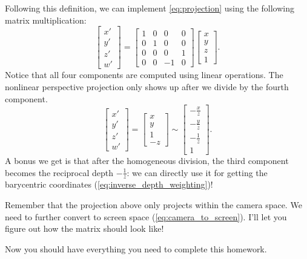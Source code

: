 Following this definition, we can implement \cref{eq:projection} using the following matrix multiplication:
\begin{equation}
\begin{bmatrix}
x' \\
y' \\
z' \\
w'
\end{bmatrix} =
\begin{bmatrix}
1 & 0 & 0 & 0 \\
0 & 1 & 0 & 0 \\
0 & 0 & 0 & 1 \\
0 & 0 & -1 & 0
\end{bmatrix}
\begin{bmatrix}
x \\
y \\
z \\
1
\end{bmatrix}.
\end{equation}
Notice that all four components are computed using linear operations. The nonlinear perspective projection only shows up after we divide by the fourth component.
\begin{equation}
\begin{bmatrix}
x' \\
y' \\
z' \\
w'
\end{bmatrix}
=
\begin{bmatrix}
x \\
y \\
1 \\
-z
\end{bmatrix}
\sim
\begin{bmatrix}
-\frac{x}{z} \\
-\frac{y}{z} \\
-\frac{1}{z} \\
1
\end{bmatrix}.
\end{equation}
A bonus we get is that after the homogeneous division, the third component becomes the reciprocal depth $-\frac{1}{z}$: we can directly use it for getting the barycentric coordinates (\cref{eq:inverse_depth_weighting})!

Remember that the projection above only projects within the camera space. We need to further convert to screen space (\cref{eq:camera_to_screen}). I'll let you figure out how the matrix should look like! 

Now you should have everything you need to complete this homework. 

